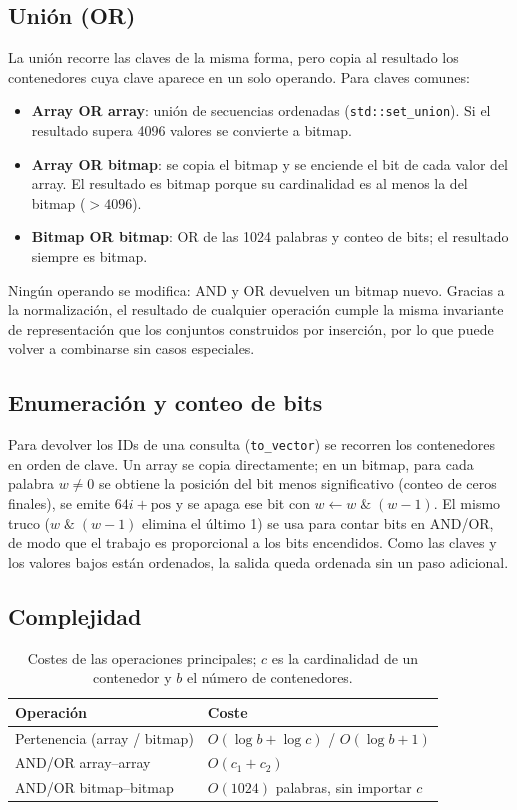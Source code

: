 \documentclass[11pt,a4paper]{article}
\begin{document}
\subsection{Unión (OR)}
La unión recorre las claves de la misma forma, pero copia al resultado los contenedores cuya clave aparece en un solo operando. Para claves comunes:
\begin{itemize}
\item \textbf{Array OR array}: unión de secuencias ordenadas (\texttt{std::set\_union}). Si el resultado supera 4096 valores se convierte a bitmap.
\item \textbf{Array OR bitmap}: se copia el bitmap y se enciende el bit de cada valor del array. El resultado es bitmap porque su cardinalidad es al menos la del bitmap ($>4096$).
\item \textbf{Bitmap OR bitmap}: OR de las 1024 palabras y conteo de bits; el resultado siempre es bitmap.
\end{itemize}
Ningún operando se modifica: AND y OR devuelven un bitmap nuevo. Gracias a la normalización, el resultado de cualquier operación cumple la misma invariante de representación que los conjuntos construidos por inserción, por lo que puede volver a combinarse sin casos especiales.

\subsection{Enumeración y conteo de bits}
Para devolver los IDs de una consulta (\texttt{to\_vector}) se recorren los contenedores en orden de clave. Un array se copia directamente; en un bitmap, para cada palabra $w\neq0$ se obtiene la posición del bit menos significativo (conteo de ceros finales), se emite $64i+\text{pos}$ y se apaga ese bit con $w \gets w \;\&\; (w-1)$. El mismo truco ($w\;\&\;(w-1)$ elimina el último 1) se usa para contar bits en AND/OR, de modo que el trabajo es proporcional a los bits encendidos. Como las claves y los valores bajos están ordenados, la salida queda ordenada sin un paso adicional.

\subsection{Complejidad}
\begin{table}[htbp]
\centering\small
\begin{tabular}{ll}
\toprule
Operación & Coste \\
\midrule
Pertenencia (array / bitmap) & $O(\log b + \log c)$ / $O(\log b + 1)$ \\
AND/OR array--array & $O(c_1+c_2)$ \\
AND/OR bitmap--bitmap & $O(1024)$ palabras, sin importar $c$ \\
\bottomrule
\end{tabular}
\caption{Costes de las operaciones principales; $c$ es la cardinalidad de un contenedor y $b$ el número de contenedores.}\label{tab:complejidad}
\end{table}
\end{document}
